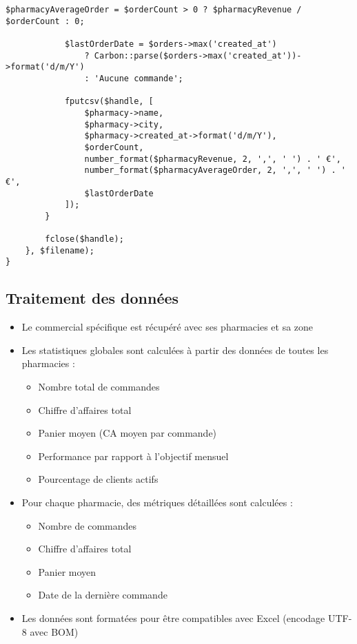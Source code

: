 \documentclass[12pt,a4paper]{article}
\begin{document}
\begin{lstlisting}[caption=Méthode exportCommercialPerformance]
            $pharmacyAverageOrder = $orderCount > 0 ? $pharmacyRevenue / $orderCount : 0;
            
            $lastOrderDate = $orders->max('created_at') 
                ? Carbon::parse($orders->max('created_at'))->format('d/m/Y') 
                : 'Aucune commande';
            
            fputcsv($handle, [
                $pharmacy->name,
                $pharmacy->city,
                $pharmacy->created_at->format('d/m/Y'),
                $orderCount,
                number_format($pharmacyRevenue, 2, ',', ' ') . ' €',
                number_format($pharmacyAverageOrder, 2, ',', ' ') . ' €',
                $lastOrderDate
            ]);
        }
        
        fclose($handle);
    }, $filename);
}
\end{lstlisting}

\subsection{Traitement des données}
\begin{itemize}
    \item Le commercial spécifique est récupéré avec ses pharmacies et sa zone
    \item Les statistiques globales sont calculées à partir des données de toutes les pharmacies :
    \begin{itemize}
        \item Nombre total de commandes
        \item Chiffre d'affaires total
        \item Panier moyen (CA moyen par commande)
        \item Performance par rapport à l'objectif mensuel
        \item Pourcentage de clients actifs
    \end{itemize}
    \item Pour chaque pharmacie, des métriques détaillées sont calculées :
    \begin{itemize}
        \item Nombre de commandes
        \item Chiffre d'affaires total
        \item Panier moyen
        \item Date de la dernière commande
    \end{itemize}
    \item Les données sont formatées pour être compatibles avec Excel (encodage UTF-8 avec BOM)
\end{itemize}
\end{document}
